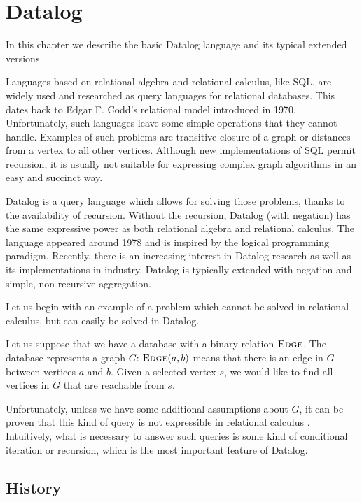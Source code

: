 
\chapter{Datalog}\label{r:datalog}

In this chapter we describe the basic Datalog language and its typical extended versions.

Languages based on relational algebra and relational calculus, like SQL, are widely used and researched as query languages for relational databases. This dates back to Edgar F. Codd's relational model \cite{coddrelmodel} introduced in 1970. Unfortunately, such languages leave some simple operations that they cannot handle. Examples of such problems are transitive closure of a graph or distances from a vertex to all other vertices. Although new implementations of SQL permit recursion, it is usually not suitable for expressing complex graph algorithms in an easy and succinct way.

Datalog \cite{fod} is a query language which allows for solving those problems, thanks to the availability of recursion. Without the recursion, Datalog (with negation) has the same expressive power as both relational algebra and relational calculus. The language appeared around 1978 and is inspired by the logical programming paradigm. Recently, there is an increasing interest in Datalog research as well as its implementations in industry. Datalog is typically extended with negation and simple, non-recursive aggregation.

Let us begin with an example of a problem which cannot be solved in relational calculus, but can easily be solved in Datalog.

Let us suppose that we have a database with a binary relation $\textsc{Edge}$. The database represents a graph $G$: $\textsc{Edge}(a, b)$ means that there is an edge in $G$ between vertices $a$ and $b$. Given a selected vertex $s$, we would like to find all vertices in $G$ that are reachable from $s$.

Unfortunately, unless we have some additional assumptions about $G$, it can be proven that this kind of query is not expressible in relational calculus \cite{fod}. Intuitively, what is necessary to answer such queries is some kind of conditional iteration or recursion, which is the most important feature of Datalog.

\section{History}

